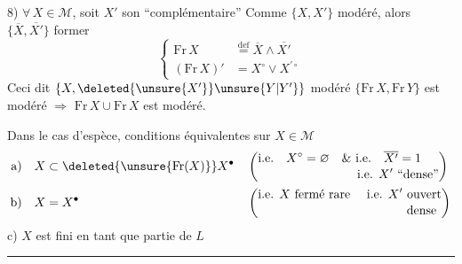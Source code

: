 8) $\forall\,X\in\mathcal M$, soit $X'$ son ``complémentaire''  Comme $\{X,X'\}$ modéré, alors $\{\overline X,\overline{X'}\}$   former
\[
\left\{\begin{aligned}
\mathrm{Fr}\,X &\overset{\text{def}}{=} \overline X\wedge\overline{X'}\\
(\mathrm{Fr}\,X)' &= X^{\circ}\vee X^{\prime\circ}
\end{aligned}\right.
\]
Ceci dit $\{X,\deleted{\unsure{X'}}\unsure{Y|Y'}\}$ modéré  $\{\mathrm{Fr}\,X,\mathrm{Fr}\,Y\}$ est modéré $\Longrightarrow$ $\mathrm{Fr}\,X\cup\mathrm{Fr}\,X$ est modéré.

   

Dans le cas d'espèce, conditions équivalentes sur $X\in\mathcal M$
\[
\begin{aligned}
\text{a)}\quad & X\subset\deleted{\unsure{\mathrm{Fr}(X)}}X^{\bullet}
&&\left(\begin{aligned}&\text{i.e.}\quad X^{\circ}=\varnothing\quad\&\ \text{i.e.}\quad\overline{X'}=1\\[-2pt]&\hspace{8em}\text{i.e. }X'\text{ ``dense''}\end{aligned}\right)\\
\text{b)}\quad & X=X^{\bullet}
&&\left(\begin{aligned}&\text{i.e. }X\text{ fermé rare \quad i.e. }X'\text{ ouvert}\\[-2pt]&\hspace{12em}\text{dense}\end{aligned}\right)
\end{aligned}
\]
c) $X$ est fini en tant que partie de $L$

\begin{center}\rule{1.6cm}{0.45pt}\end{center}

